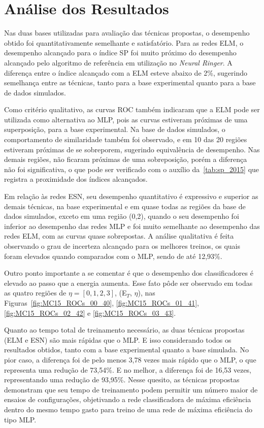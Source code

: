 \section{Análise dos Resultados}

Nas duas bases utilizadas para avaliação das técnicas propostas, o desempenho obtido foi quantitativamente semelhante e satisfatório. Para as redes ELM, o desempenho alcançado para o índice SP foi muito próximo do desempenho alcançado pelo algoritmo de referência em utilização no \textit{Neural Ringer}. A diferença entre o índice alcançado com a ELM esteve abaixo de 2\%, sugerindo semelhança entre as técnicas, tanto para a base experimental quanto para a base de dados simulados.

Como critério qualitativo, as curvas ROC também indicaram que a ELM pode ser utilizada como alternativa ao MLP, pois as curvas estiveram próximas de uma superposição, para a base experimental. Na base de dados simulados, o comportamento de similaridade também foi observado, e em 10 das 20 regiões estiveram próximas de se sobreporem, sugerindo equivalência de desempenho. Nas demais regiões, não ficaram próximas de uma sobreposição, porém a diferença não foi significativa, o que pode ser verificado com o auxílio da~\autoref{tab:sp_2015} que registra a proximidade dos índices alcançados.

Em relação às redes ESN, seu desempenho quantitativo é expressivo e superior as demais técnicas, na base experimental e em quase todas as regiões da base de dados simulados, exceto em uma região (0,2), quando o seu desempenho foi inferior ao desempenho das redes MLP e foi muito semelhante ao desempenho das redes ELM, com as curvas quase sobrepostas. A análise qualitativa é feita observando o grau de incerteza alcançado para os melhores treinos, os quais foram elevados quando comparados com o MLP, sendo de até 12,93\%.

Outro ponto importante a se comentar é que o desempenho dos classificadores é elevado ao passo que a energia aumenta. Esse fato pôde ser observado em todas as quatro regiões de $\eta=[0,1,2,3]$, (E$_T$, $\eta$), nas Figuras~\ref{fig:MC15_ROCs_00_40}, \ref{fig:MC15_ROCs_01_41}, \ref{fig:MC15_ROCs_02_42} e \ref{fig:MC15_ROCs_03_43}.

Quanto ao tempo total de treinamento necessário, as duas técnicas propostas (ELM e ESN) são mais rápidas que o MLP. E isso considerando todos os resultados obtidos, tanto com a base experimental quanto a base simulada. No pior caso, a diferença foi de pelo menos 3,78 vezes mais rápido que o MLP, o que representa uma redução de 73,54\%. E no melhor, a diferença foi de 16,53 vezes, representando uma redução de 93,95\%. Nesse quesito, as técnicas propostas demonstram que seu tempo de treinamento podem permitir um número maior de ensaios de configurações, objetivando a rede classificadora de máxima eficiência dentro do mesmo tempo gasto para treino de uma rede de máxima eficiência do tipo MLP.

